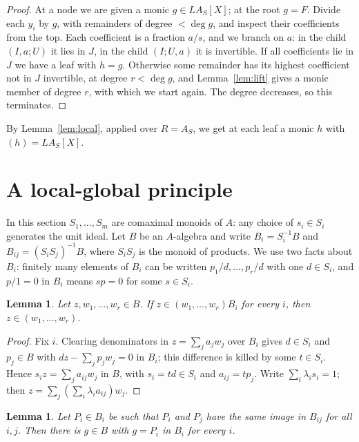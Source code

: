\documentclass[11pt]{amsart}
\newtheorem{lemma}[theorem]{Lemma}
\theoremstyle{remark}
\begin{document}
\begin{proof}
At a node we are given a monic $g\in LA_S[X]$; at the root $g=F$. Divide each
$y_i$ by $g$, with remainders of degree $<\deg g$, and inspect their
coefficients from the top. Each coefficient is a fraction $a/s$, and we branch
on $a$: in the child $(I,a;U)$ it lies in $J$, in the child $(I;U,a)$ it is
invertible. If all coefficients lie in $J$ we have a leaf with $h=g$. Otherwise
some remainder has its highest coefficient not in $J$ invertible, at degree
$r<\deg g$, and Lemma~\ref{lem:lift} gives a monic member of degree $r$, with
which we start again. The degree decreases, so this terminates.
\end{proof}

By Lemma~\ref{lem:local}, applied over $R=A_S$, we get at each leaf a monic
$h$ with $(h)=LA_S[X]$.

\section{A local-global principle}

In this section $S_1,\dots,S_m$ are comaximal monoids of $A$: any choice of
$s_i\in S_i$ generates the unit ideal. Let $B$ be an $A$-algebra and write
$B_i=S_i^{-1}B$ and $B_{ij}=(S_iS_j)^{-1}B$, where $S_iS_j$ is the monoid of
products. We use two facts about $B_i$: finitely many elements of $B_i$ can be
written $p_1/d,\dots,p_r/d$ with one $d\in S_i$, and $p/1=0$ in $B_i$ means $sp=0$
for some $s\in S_i$.

\begin{lemma}\label{lem:member}
Let $z,w_1,\dots,w_r\in B$. If $z\in(w_1,\dots,w_r)B_i$ for every $i$, then
$z\in(w_1,\dots,w_r)$.
\end{lemma}

\begin{proof}
Fix $i$. Clearing denominators in $z=\sum_ja_jw_j$ over $B_i$ gives $d\in S_i$
and $p_j\in B$ with $dz-\sum_jp_jw_j=0$ in $B_i$; this difference is killed by
some $t\in S_i$. Hence $s_iz=\sum_ja_{ij}w_j$ in $B$, with $s_i=td\in S_i$ and
$a_{ij}=tp_j$. Write $\sum_i\lambda_is_i=1$; then
$z=\sum_j(\sum_i\lambda_ia_{ij})w_j$.
\end{proof}

\begin{lemma}\label{lem:glue}
Let $P_i\in B_i$ be such that $P_i$ and $P_j$ have the same image in $B_{ij}$
for all $i,j$. Then there is $g\in B$ with $g=P_i$ in $B_i$ for every $i$.
\end{lemma}
\end{document}
